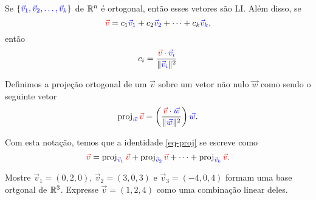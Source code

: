\begin{frame}[label=orto]{}
Se $\{{\color{blue}\vec{v}_1,\vec{v}_2,\ldots, \vec{v}_k}\}$  de $\mathbb{R}^n$  é ortogonal, então esses vetores são LI. Além disso, se
\begin{equation}\label{eq-proj}
{\color{red}\vec{v}}=c_1{\color{blue}\vec{v}_1}+c_2{\color{blue}\vec{v}_2}+\cdots +c_k{\color{blue}\vec{v}_k},
\end{equation}
então
\[c_i=\frac{{\color{red}\vec{v}}\cdot{\color{blue} {\color{blue}\vec{v}_i}}}{\|{\color{blue}\vec{v}_i}\|^2}\] 

\begin{defin}
Definimos a {\color{blue}projeção ortogonal} de um {\color{red}$\vec{v}$} sobre um vetor  {\color{red} não nulo} {\color{blue}$\vec{w}$} como sendo o seguinte vetor
\[\operatorname{proj}_{{\color{blue}\vec{w}}}{\color{red}\vec{v}}=
\left(\frac{ {\color{red}\vec{v}}\cdot
{\color{blue}\vec{w}} }{\|{\color{blue}\vec{w}}\|^2}\right)
{\color{blue}\vec{w}}.
\]
\end{defin}
Com esta notação, temos que a identidade \eqref{eq-proj} se escreve como
\[{\color{red}\vec{v}}=\operatorname{proj}_{{\color{blue}\vec{v}_1}}{\color{red}\vec{v}}+\operatorname{proj}_{{\color{blue}\vec{v}_2}}{\color{red}\vec{v}}+\cdots +\operatorname{proj}_{{\color{blue}\vec{v}_k}}{\color{red}\vec{v}}.\]
\end{frame}

\begin{frame}[label=orto]{}

\begin{exe}
Mostre $\vec{v}_1=(0,2,0)$, $\vec{v}_2=(3,0,3)$ e $\vec{v}_3=(-4,0,4)$ formam uma base ortgonal de $\mathbb{R}^3$. Expresse $\vec{v}=(1,2,4)$ como uma combinação linear deles. 
\end{exe}

\end{frame}


%


